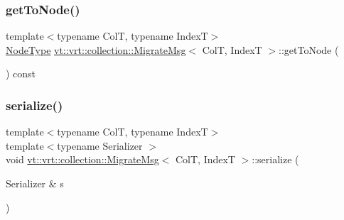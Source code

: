\subsubsection{\texorpdfstring{get\+To\+Node()}{getToNode()}}
{\footnotesize\ttfamily template$<$typename ColT, typename IndexT$>$ \\
\hyperlink{namespacevt_a866da9d0efc19c0a1ce79e9e492f47e2}{Node\+Type} \hyperlink{structvt_1_1vrt_1_1collection_1_1_migrate_msg}{vt\+::vrt\+::collection\+::\+Migrate\+Msg}$<$ ColT, IndexT $>$\+::get\+To\+Node (\begin{DoxyParamCaption}{ }\end{DoxyParamCaption}) const\hspace{0.3cm}{\ttfamily [inline]}}

\mbox{\label{structvt_1_1vrt_1_1collection_1_1_migrate_msg_afd275449bca23638c2d8139fff35d39f}} 
\subsubsection{\texorpdfstring{serialize()}{serialize()}}
{\footnotesize\ttfamily template$<$typename ColT, typename IndexT$>$ \\
template$<$typename Serializer $>$ \\
void \hyperlink{structvt_1_1vrt_1_1collection_1_1_migrate_msg}{vt\+::vrt\+::collection\+::\+Migrate\+Msg}$<$ ColT, IndexT $>$\+::serialize (\begin{DoxyParamCaption}\item[{Serializer \&}]{s }\end{DoxyParamCaption})\hspace{0.3cm}{\ttfamily [inline]}}

\mbox{\label{structvt_1_1vrt_1_1collection_1_1_migrate_msg_ad6dcb8f2f1555556800b50195d219c19}} 
